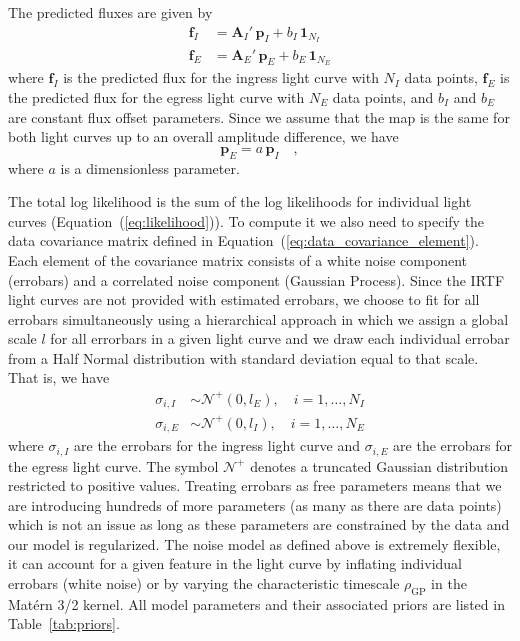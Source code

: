 \documentclass[modern]{aastex62}
\begin{document}
The predicted fluxes are given by 
\begin{align}
    \mathbf{f}_I&=\mathbf{A}_I'\,\mathbf{p}_I +b_I\,\mathbf{1}_{N_I}\\
    \mathbf{f}_E&=\mathbf{A}_E'\,\mathbf{p}_E +b_E\,\mathbf{1}_{N_E}
\end{align}
where $\mathbf{f}_I$ is the predicted flux for the ingress light curve with $N_I$ data points, $\mathbf{f}_E$ is the predicted flux for the egress light curve with $N_E$ data points, and $b_I$ and $b_E$ are constant flux offset parameters.
Since we assume that the map is the same for both light curves up to an overall amplitude difference, we have
\begin{equation}
    \mathbf{p}_E=a\,\mathbf{p}_I
    \quad,
\end{equation}
where $a$ is a dimensionless parameter.

The total log likelihood is the sum of the log likelihoods for individual light curves (Equation~(\ref{eq:likelihood})). 
To compute it we also need to specify the data covariance matrix defined in Equation~(\ref{eq:data_covariance_element}).
Each element of the covariance matrix consists of a white noise component (errobars) and a correlated noise component (Gaussian Process).
Since the IRTF light curves are not provided with estimated errobars, we choose to fit for all errobars simultaneously using a hierarchical approach in which we assign a global scale $l$ for all errorbars in a given light curve and we draw each individual errobar from a Half Normal distribution with standard deviation equal to that scale.
That is, we have 
\begin{align}
    \sigma_{i,I}&\sim \mathcal{N}^+(0, l_E),\quad i=1,\dots,N_I\\
    \sigma_{i,E}&\sim \mathcal{N}^+(0,l_I),\quad i=1,\dots, N_E
\end{align}
where $\sigma_{i,I}$ are the errobars for the ingress light curve and $\sigma_{i,E}$ are the errobars for the egress light curve.
The symbol $\mathcal{N}^+$ denotes a truncated Gaussian distribution restricted to positive values.
Treating errobars as free parameters means that we are introducing hundreds of more parameters (as many as there are data points) which is not an issue as long as these parameters are constrained by the data and our model is regularized.
The noise model as defined above is extremely flexible, it can account for a given feature in the light curve by inflating individual errobars (white noise) or by varying the characteristic timescale $\rho_\mathrm{GP}$ in the Mat\'ern 3/2 kernel.
All model parameters and their associated priors are listed in Table~\ref{tab:priors}. 
\end{document}
